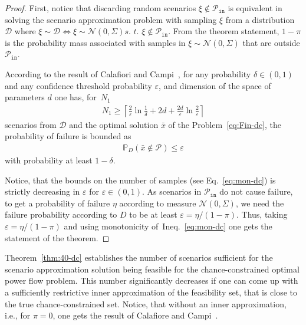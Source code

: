 \begin{proof}
First, notice that discarding random scenarios $\xi\notin \mathcal{P}_{\texttt{in}}$ is equivalent in solving the scenario approximation problem with sampling $\xi$ from a distribution $\mathcal{D}$ where  $\xi \sim \mathcal{D} \Leftrightarrow \xi\sim \mathcal{N}(0, \Sigma) \textit{s. t. } \xi\not\in \mathcal{P}_{\texttt{in}}$. From the theorem statement, $1-\pi$ is the probability mass associated with samples in $\xi\sim \mathcal{N}(0, \Sigma)$ that are outside $\mathcal{P}_{\texttt{in}}$.

According to the result of Calafiori and Campi~\cite{calafiore2006scenario}, for any probability $\delta\in (0,1)$ and any confidence threshold probability $\varepsilon$, and dimension of the space of parameters $d$ one has, for~$N_1$
\begin{align}\label{eq:mon-dc}
  N_1 \ge \left\lceil \frac{2}{\varepsilon} \ln \frac{1}{\delta} + 2d + \frac{2d}{\varepsilon} \ln \frac{2}{\varepsilon}\right\rceil 
\end{align}
scenarios from $\mathcal{D}$ and the optimal solution 
$\bar x$ of the Problem~\eqref{eq:Fin-dc}, 
the probability of failure is bounded as
\begin{align*}
  \mathbb{P}_D(\bar{x}\not\in \mathcal{P}) \le \varepsilon
\end{align*}
with probability at least $1-\delta$. 

Notice, that the bounds on the number of samples (see Eq.~\eqref{eq:mon-dc}) is strictly decreasing in $\varepsilon$ for $\varepsilon \in (0,1)$. As scenarios in $\mathcal{P}_{\texttt{in}}$ do not cause failure, to get a probability of failure $\eta$ according to measure $\mathcal{N}(0, \Sigma)$, we need the failure probability according to $D$ to be at least $\varepsilon = \eta/(1-\pi)$.  
Thus, taking $\varepsilon = \eta/(1-\pi)$ and using monotonicity of~Ineq.~\eqref{eq:mon-dc} one gets the statement of the theorem. 
\end{proof}

Theorem~\ref{thm:40-dc} establishes the number of scenarios sufficient for the scenario approximation solution being feasible for the chance-constrained optimal power flow problem. This number significantly decreases if one can come up with a sufficiently restrictive inner approximation of the feasibility set, that is close to the true chance-constrained set. Notice, that without an inner approximation, i.e., for $\pi = 0$, one gets the result of Calafiore and Campi~\cite[Theorem 1]{calafiore2006scenario}. %

